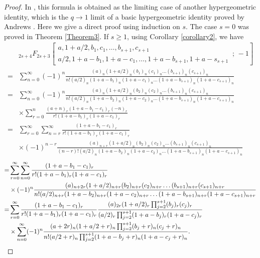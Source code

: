 \documentclass[reqno]{amsart}
\theoremstyle{definition}
\theoremstyle{remark}
\numberwithin{equation}{section}
\begin{document}
\begin{proof}In \cite{2}, this formula is obtained as the limiting case of another hypergeometric identity, which is the $q\rightarrow 1$ limit of a basic hypergeometric identity proved by Andrews \cite{12}. Here we give a direct proof using induction on $s$. The case $s=0$ was proved in Theorem \ref{Theorem3}. If $s\geq 1$, using Corollary \ref{corollary2}, we have
\begin{align*}
&_{2s+4}F_{2s+3}\left[\begin{aligned}a, 1+a/2, b_1, c_1, \ldots, b_{s+1}, c_{s+1}\hspace{2cm}\\a/2, 1+a-b_1, 1+a-c_1, \ldots, 1+a-b_{s+1}, 1+a-s_{s+1}\end{aligned}\,;\,-1\right]\\
=&\sum_{n=0}^{\infty}(-1)^n\frac{(a)_n(1+a/2)_n(b_1)_n(c_1)_n\ldots(b_{s+1})_n(c_{s+1})_n }{n! (a/2)_n(1+a-b_1)_n(1+a-c_1)_n \ldots (1+a-b_{s+1})_n (1+a-c_{s+1})_n  }\\
=&\sum_{n=0}^{\infty}(-1)^n\frac{(a)_n(1+a/2)_n(b_2)_n(c_2)_n\ldots(b_{s+1})_n(c_{s+1})_n }{n! (a/2)_n(1+a-b_2)_n(1+a-c_2)_n \ldots (1+a-b_{s+1})_n (1+a-c_{s+1})_n }\\&\times\sum_{r=0}^n\frac{(a+n)_r (1+a-b_1-c_1)_r(-n)_r}{r! (1+a-b_1)_r(1+a-c_1)_r}\\
=&\sum_{r=0}^{\infty}\sum_{n=r}^{\infty}\frac{(1+a-b_1-c_1)_r }{r! (1+a-b_1)_r(1+a-c_1)_r}\\
&\times(-1)^{n-r}\frac{(a)_{n+r}(1+a/2)_n(b_2)_n(c_2)_n\ldots(b_{s+1})_n(c_{s+1})_n }{(n-r)! (a/2)_n(1+a-b_2)_n(1+a-c_2)_n \ldots (1+a-b_{s+1})_n (1+a-c_{s+1})_n}\end{align*}\begin{align*}
=&\sum_{r=0}^{\infty} \sum_{n=0}^{\infty}\frac{(1+a-b_1-c_1)_r   }{r! (1+a-b_1)_r(1+a-c_1)_r}\\
&\times(-1)^n\frac{(a)_{n+2r}(1+a/2)_{n+r}(b_2)_{n+r}(c_2)_{n+r}\ldots(b_{s+1})_{n+r}(c_{s+1})_{n+r} }{n! (a/2)_{n+r}(1+a-b_2)_{n+r}(1+a-c_2)_{n+r} \ldots (1+a-b_{s+1})_{n+r} (1+a-c_{s+1})_{n+r}  }\\
=&\sum_{r=0}^{\infty} \frac{(1+a-b_1-c_1)_r  }{r! (1+a-b_1)_r(1+a-c_1)_r}\frac{(a)_{2r}(1+a/2)_{r} {\displaystyle} \prod_{j=2}^{s+1}(b_j)_{r}(c_j)_{r}}{ (a/2)_{r} {\displaystyle}\prod_{j=2}^{s+1}(1+a-b_j)_{r}(1+a-c_j)_{r}}\\
&\times \sum_{n=0}^{\infty}(-1)^n\frac{(a+2r)_{n}(1+a/2+r)_{n}  {\displaystyle} \prod_{j=2}^{s+1}(b_j+r)_{n}(c_j+r)_{n}}{n! (a/2+r)_{n}  {\displaystyle}\prod_{j=2}^{s+1}(1+a-b_j+r)_{n}(1+a-c_j+r)_{n}}.\end{align*}

\end{proof}
\end{document}

